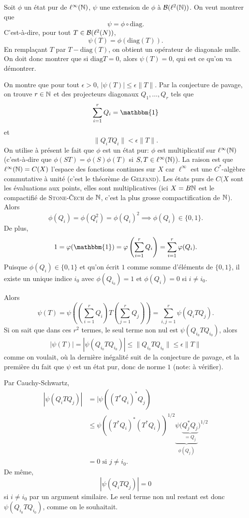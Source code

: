 \begin{preuve}
  Soit $\phi$ un état pur de $\ell^\infty(\mathbb{N})$, $\psi$ une extension de $\phi$ à $\mathcal{B}(\ell^2(\mathbb{N}))$. On veut
  montrer que 
  \[ \psi = \phi \circ \mathrm{diag}. \]
  C'est-à-dire, pour tout $T \in \mathcal{B}(\ell^2(N))$, 
  \[ \psi(T) = \phi(\mathrm{diag}(T)). \]
  En remplaçant $T$ par $T - \mathrm{diag}(T)$, on obtient un opérateur de diagonale nulle. On doit donc
  montrer que si $\mathrm{diag} T = 0$, alors $\psi(T) = 0$, qui est ce qu'on va démontrer.

  On montre que pour tout $\epsilon > 0$, $|\psi(T)| \leq \epsilon \|T\|$. Par la conjecture de pavage, on
  trouve $r \in \mathbb{N}$ et des projecteurs diagonaux $Q_1, \ldots, Q_r$ tels que 
  \[ \sum_{i = 1}^{r} Q_i = \mathbbm{1} \]
  et 
  \[ \|Q_iTQ_i\| < \epsilon \|T\|. \]
  On utilise à présent le fait que $\phi$ est un état pur: $\phi$ est multiplicatif sur $\ell^\infty(\mathbb{N})$
  (c'est-à-dire que $\phi(ST) = \phi(S)\phi(T)$ si $S, T \in \ell^\infty(\mathbb{N})$). La raison est que
  $\ell^\infty(\mathbb{N}) = C(X)$ l'espace des fonctions continues sur $X$ car $\ell^\infty$ est une
  $C^\ast$-algèbre commutative à unité (c'est le théorème de \textsc{Gelfand}). Les états purs de $C(X$ sont
  les évaluations aux points, elles sont multiplicatives (ici $X = B\mathbb{N}$ est le compactifié de
  \textsc{Stone-\v{C}ech} de $\mathbb{N}$, c'est la plus grosse compactification de $\mathbb{N}$).
  Alors 
  \[ \phi(Q_i) = \phi(Q_i^2) = \phi(Q_i)^2 \implies \phi(Q_i) \in \{0,1\}. \]
  De plus, 
  \[ 1 = \phi(\mathbbm{1}) = \phi \left(\sum_{i = 1}^{r} Q_i\right) = \sum_{i = 1}^{r}\phi(Q_i). \]
  Puisque $\phi(Q_i) \in \{0,1\}$ et qu'on écrit $1$ comme somme d'éléments de $\{0,1\}$, il existe un unique
  indice $i_0$ avec $\phi(Q_{i_0}) = 1$ et $\phi(Q_i) = 0$ si $i \neq i_0$.

  Alors 
  \[ \psi(T) = \psi \left( \left(\sum_{i=1}^{r} Q_i\right) T \left(\sum_{j = 1}^{r} Q_j\right)\right) =
    \sum_{i,j=1}^{r} \psi(Q_iTQ_j). \]
  Si on sait que dans ces $r^2$ termes, le seul terme non nul est $\psi(Q_{i_0}TQ_{i_0})$, alors 
  \[ |\psi(T)| = |\psi(Q_{i_0}TQ_{i_0})| \leq \|Q_{i_0}TQ_{i_0}\| \leq \epsilon \|T\| \]
  comme on voulait, où la dernière inégalité suit de la conjecture de pavage, et la première du fait que
  $\psi$ est un état pur, donc de norme $1$ (note: à vérifier).

  Par Cauchy-Schwartz, 
  \begin{align*}
    |\psi(Q_iTQ_j)| &= |\psi\left((T^\ast Q_i)^\ast Q_j\right)\\
    &\leq \psi \left((T^\ast Q_i)^\ast (T^\ast Q_i)\right)^{1/2} \underbrace{\psi(\underbrace{Q_j^\ast Q_j}_{=Q_j}}_{\phi(Q_j)}) ^{1/2}\\
    &= 0 \text{ si } j \neq i_0.
  \end{align*}
  De même, 
  \[ |\psi(Q_i T Q_j)| = 0 \]
  si $i \neq i_0$ par un argument similaire. Le seul terme non nul restant est donc $\psi(Q_{i_0}TQ_{i_0})$,
  comme on le souhaitait.
\end{preuve}



